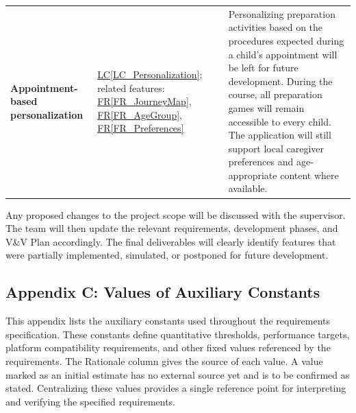 \documentclass[10pt]{article}
\newcommand{\rref}[1]{\hyperref[#1]{FR\ref*{#1}}}
\newcommand{\lcref}[1]{\hyperref[#1]{LC\ref*{#1}}}
\begin{document}
\begin{longtable}{@{}>{\raggedright\arraybackslash}p{}
>{\raggedright\arraybackslash}p{}
>{\raggedright\arraybackslash}p{}@{}}
\textbf{Appointment-based personalization} &
\lcref{LC_Personalization};
related features:
\rref{FR_JourneyMap},
\rref{FR_AgeGroup},
\rref{FR_Preferences} &
Personalizing preparation activities based on
the procedures expected during a child's
appointment will be left for future development.
During the course, all preparation games will
remain accessible to every child. The application
will still support local caregiver preferences
and age-appropriate content where available. \\

\end{longtable}
\endgroup

Any proposed changes to the project scope will be
discussed with the supervisor. The team will then
update the relevant requirements, development phases,
and V\&V Plan accordingly. The final deliverables will
clearly identify features that were partially implemented,
simulated, or postponed for future development.

\newpage
\subsection{Appendix C: Values of Auxiliary Constants}
\label{sec_Constants}

This appendix lists the auxiliary constants used throughout the
requirements specification. These constants define quantitative
thresholds, performance targets, platform compatibility requirements,
and other fixed values referenced by the requirements. The Rationale
column gives the source of each value. A value marked as an initial estimate
has no external source yet and is to be confirmed as stated. Centralizing
these values provides a single reference point for interpreting and
verifying the specified requirements.
\end{document}
